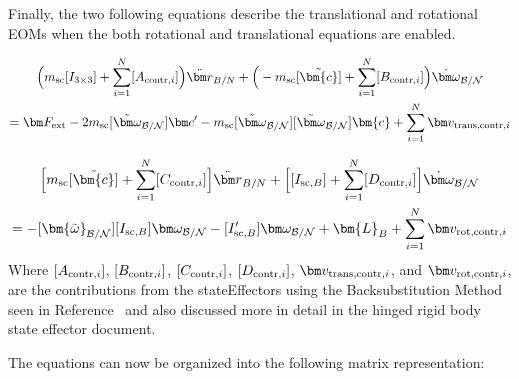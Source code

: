 Finally, the two following equations describe the translational and rotational EOMs when the both rotational and translational equations are enabled.

\begin{multline}
\Big(m_{\text{sc}} [I_{3\times3}] +\sum_{i=1}^{N}[A_{\textnormal{contr},i}]\Big)\ddot{\bm r}_{B/N}+\Big(-m_{\text{sc}} [\tilde{\bm{c}}] +\sum_{i=1}^{N}[B_{\textnormal{contr},i}]\Big) \dot{\bm\omega}_{\cal B/N} \\
= \bm F_{\textnormal{ext}} 	- 2 m_{\text{sc}} [\tilde{\bm\omega}_{\cal B/N}] \bm c'
-m_{\text{sc}} [\tilde{\bm\omega}_{\cal B/N}][\tilde{\bm\omega}_{\cal B/N}]\bm{c}
+\sum_{i=1}^{N}\bm v_{\textnormal{trans,contr},i}
\label{eq:Rbddot8}
\end{multline}

\begin{multline}
\Big[m_{\text{sc}}[\tilde{\bm{c}}] +\sum\limits_{i=1}^{N}[C_{\textnormal{contr},i}]\Big]\ddot{\bm r}_{B/N}+\Big[[I_{\text{sc},B}]+\sum\limits_{i=1}^{N}[D_{\textnormal{contr},i}]\Big]\dot{\bm\omega}_{\cal B/N}
\\
= -[\bm{\tilde{\omega}}_{\cal B/N}] [I_{\text{sc},B}] \bm\omega_{\cal B/N}
- [I'_{\text{sc},B}] \bm\omega_{\cal B/N} + \bm{L}_B +\sum\limits_{i=1}^{N}\bm v_{\textnormal{rot,contr},i}
\label{eq:Final9}
\end{multline}
Where $[A_{\textnormal{contr},i}]$, $[B_{\textnormal{contr},i}]$, $[C_{\textnormal{contr},i}]$, $[D_{\textnormal{contr},i}]$, $\bm v_{\textnormal{trans,contr},i}$, and $\bm v_{\textnormal{rot,contr},i}$, are the contributions from the stateEffectors using the Backsubstitution Method seen in Reference~\cite{Allard2016rz} and also discussed more in detail in the hinged rigid body state effector document.

The equations can now be organized into the following matrix representation:


